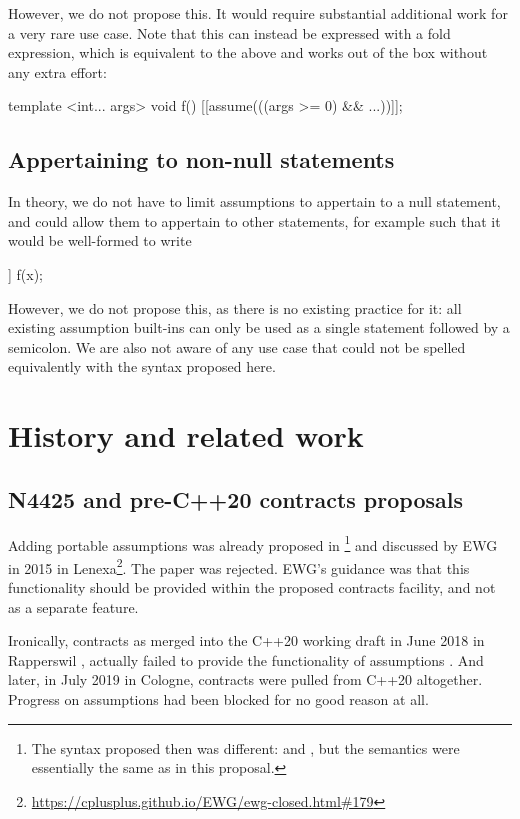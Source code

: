 However, we do not propose this. It would require substantial additional work for a very rare use case. Note that this can instead be expressed with a fold expression, which is equivalent to the above and works out of the box without any extra effort:

\begin{codeblock}
template <int... args>
void f() {
    [[assume(((args >= 0) && ...))]];
}
\end{codeblock}

\subsection{Appertaining to non-null statements}
In theory, we do not have to limit assumptions to appertain to a null statement, and could allow them to appertain to other statements, for example such that it would be well-formed to write
\begin{codeblock}
[[assume(x >= 0)]] f(x);
\end{codeblock}
However, we do not propose this, as there is no existing practice for it: all existing assumption built-ins can only be used as a single statement followed by a semicolon. We are also not aware of any use case that could not be spelled equivalently with the syntax proposed here.


\section{History and related work}
\label{sec:history}

\subsection{N4425 and pre-C++20 contracts proposals}
\label{sec:contracts}

Adding portable assumptions was already proposed in \cite{N4425}\footnote{The syntax proposed then was different:  and , but the semantics were essentially the same as in this proposal.} and discussed by EWG in 2015 in Lenexa\footnote{\url{https://cplusplus.github.io/EWG/ewg-closed.html\#179}}. The paper was rejected. EWG's guidance was that this functionality should be provided within the proposed contracts facility, and not as a separate feature.

Ironically, contracts as merged into the C++20 working draft in June 2018 in Rapperswil \cite{P0542R5}, actually failed to provide the functionality of assumptions \cite{P1773R0}. And later, in July 2019 in Cologne, contracts were pulled from C++20 altogether. Progress on assumptions had been blocked for no good reason at all.

